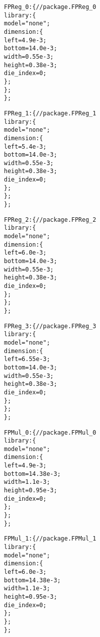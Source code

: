 {\begin{alltt}
            FPReg\_0: \{ // package.FPReg\_0
                library: \{
                    model = "none";
                    dimension: \{
                        left = 4.9e-3;
                        bottom = 14.0e-3;
                        width = 0.55e-3;
                        height = 0.38e-3;
                        die_index = 0;
                    \};
                \};
            \};

            FPReg\_1: \{ // package.FPReg\_1
                library: \{
                    model = "none";
                    dimension: \{
                        left = 5.4e-3;
                        bottom = 14.0e-3;
                        width = 0.55e-3;
                        height = 0.38e-3;
                        die_index = 0;
                    \};
                \};
            \};

            FPReg\_2: \{ // package.FPReg\_2
                library: \{
                    model = "none";
                    dimension: \{
                        left = 6.0e-3;
                        bottom = 14.0e-3;
                        width = 0.55e-3;
                        height = 0.38e-3;
                        die_index = 0;
                    \};
                \};
            \};
            
            FPReg\_3: \{ // package.FPReg\_3
                library: \{
                    model = "none";
                    dimension: \{
                        left = 6.55e-3;
                        bottom = 14.0e-3;
                        width = 0.55e-3;
                        height = 0.38e-3;
                        die_index = 0;
                    \};
                \};
            \};

            FPMul\_0: \{ // package.FPMul\_0
                library: \{
                    model = "none";
                    dimension: \{
                        left = 4.9e-3;
                        bottom = 14.38e-3;
                        width = 1.1e-3;
                        height = 0.95e-3;
                        die_index = 0;
                    \};
                \};
            \};

            FPMul\_1: \{ // package.FPMul\_1
                library: \{
                    model = "none";
                    dimension: \{
                        left = 6.0e-3;
                        bottom = 14.38e-3;
                        width = 1.1e-3;
                        height = 0.95e-3;
                        die_index = 0;
                    \};
                \};
            \};
            

\end{alltt}}
